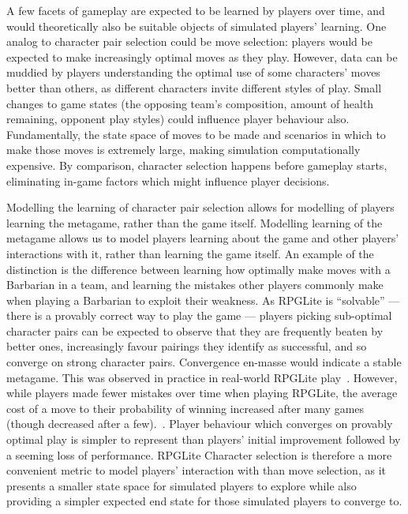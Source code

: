 A few facets of gameplay are expected to be learned by players over time, and
would theoretically also be suitable objects of simulated players' learning. One
analog to character pair selection could be move selection: players would be
expected to make increasingly optimal moves as they play. However, data can be
muddied by players understanding the optimal use of some characters' moves
better than others, as different characters invite different styles of play.
Small changes to game states (the opposing team's composition, amount of health
remaining, opponent play styles) could influence player behaviour also.
Fundamentally, the state space of moves to be made and scenarios in which to
make those moves is extremely large, making simulation computationally
expensive. By comparison, character selection happens before gameplay starts,
eliminating in-game factors which might influence player decisions.

Modelling the learning of character pair selection allows for modelling of
players learning the metagame, rather than the game itself. Modelling learning
of the metagame allows us to model players learning about the game and other
players' interactions with it, rather than learning the game itself. An example
of the distinction is the difference between learning how optimally make moves
with a Barbarian in a team, and learning the mistakes other players commonly
make when playing a Barbarian to exploit their weakness. As RPGLite is
``solvable'' --- there is a provably correct way to play the game --- players
picking sub-optimal character pairs can be expected to observe that they are
frequently beaten by better ones, increasingly favour pairings they identify as
successful, and so converge on strong character pairs. Convergence en-masse
would indicate a stable metagame. This was observed in practice in real-world
RPGLite play~\cite{kavanagh2021gameplay}. However, while players made fewer
mistakes over time when playing RPGLite, the average cost of a move to their
probability of winning increased after many games (though decreased after a
few).~\cite{kavanagh2021gameplay}. Player behaviour which converges on provably
optimal play is simpler to represent than players' initial improvement followed
by a seeming loss of performance. RPGLite Character selection is therefore a
more convenient metric to model players' interaction with than move selection,
as it presents a smaller state space for simulated players to explore while also
providing a simpler expected end state for those simulated players to converge
to.

